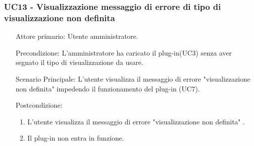 \subsubsection{UC13 - Visualizzazione messaggio di errore di tipo di visualizzazione non definita}
\label{sssec:uc13}
\begin{description}
	\begin{enumerate}
		\item[Attore primario:] Utente amministratore.
		\item[Precondizione:] L'amministratore ha caricato il plug-in(UC3) senza aver segnato il tipo di visualizzazione da usare.
		\item[Scenario Principale:] L'utente visualizza il messaggio di errore "visualizzazione non definita" impedendo il funzionamento del plug-in (UC7).
		\item[Postcondizione:]
		\begin{enumerate}
			\item L'utente visualizza il messaggio di errore "visualizzazione non definita" .
			\item Il plug-in non entra in funzione.
		\end{enumerate}
	\end{enumerate}
\end{description}